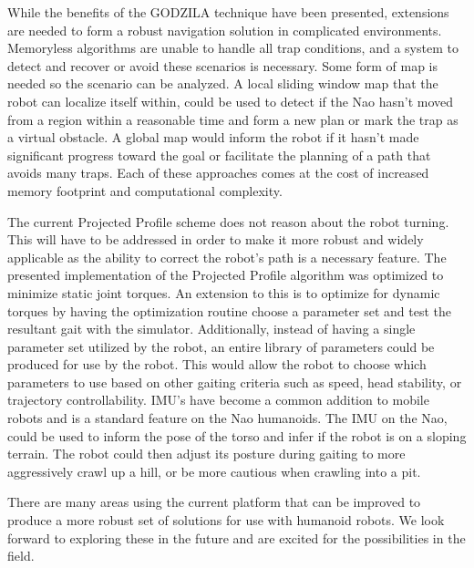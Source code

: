 
While the benefits of the GODZILA technique have been presented, extensions
are needed to form a robust navigation solution in complicated environments.
Memoryless algorithms are unable to handle all trap conditions, and a system
to detect and recover or avoid these scenarios is necessary. Some form of map
is needed so the scenario can be analyzed. A local sliding window map that the
robot can localize itself within, could be used to detect if the
Nao hasn't moved from a region within a reasonable time and form a new plan
or mark the trap as a virtual obstacle. A global map would inform
the robot if it hasn't made significant progress toward the goal or facilitate 
the planning of a path that avoids many traps. Each of these approaches comes 
at the cost of increased memory footprint and computational complexity.

The current Projected Profile scheme does not reason about the robot turning.
This will have to be addressed in order to make it more robust and widely 
applicable as the ability to correct the robot's path is a necessary feature.
The presented implementation of the Projected Profile algorithm was optimized
to minimize static joint torques. An extension to this is to optimize for
dynamic torques by having the optimization routine choose a parameter set and 
test the resultant gait with the simulator. Additionally, instead of having
a single parameter set utilized by the robot, an entire library of parameters
could be produced for use by the robot. This would allow the robot to choose
which parameters to use based on other gaiting criteria such as speed, head
stability, or trajectory controllability. 
IMU's have become a common addition to mobile robots and is a standard
feature on the Nao humanoids. The IMU on the Nao, could be used to inform the
pose of the torso and infer if the robot is on a sloping terrain. The robot
could then adjust its posture during gaiting to more aggressively crawl up
a hill, or be more cautious when crawling into a pit.

There are many areas using the current platform that can be improved to produce
a more robust set of solutions for use with humanoid robots. We look forward
to exploring these in the future and are excited for the possibilities in the
field.
